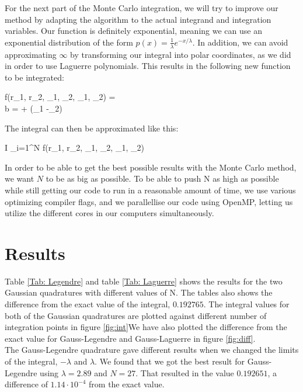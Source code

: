 \documentclass{article}
\begin{document}
		For the next part of the Monte Carlo integration, we will try to improve our method by adapting the algorithm to the actual integrand and integration variables. Our function is definitely exponential, meaning we can use an exponential distribution of the form $p(x)=\frac{1}{\lambda} e^{-x/\lambda}$. In addition, we can avoid approximating $\infty$ by transforming our integral into polar coordinates, as we did in order to use Laguerre polynomials. This results in the following new function to be integrated:

		\begin{flalign*}
			f(r_1, r_2, \phi_1, \phi_2, \theta_1, \theta_2) =  \\
			b =   +   \cos (\phi_1 -\phi_2)
		\end{flalign*}

		The integral can then be approximated like this:

		\begin{flalign*}
			I \approx {} \sum_{i=1}^{N} f(r_1, r_2, \phi_1, \phi_2, \theta_1, \theta_2)
		\end{flalign*}

		In order to be able to get the best possible results with the Monte Carlo method, we want $N$ to be as big as possible. To be able to push N as high as possible while still getting our code to run in a reasonable amount of time, we use various optimizing compiler flags, and we parallellise our code using OpenMP, letting us utilize the different cores in our computers simultaneously.

\section*{Results}
	Table \ref{Tab: Legendre} and table \ref{Tab: Laguerre} shows the results for the two Gaussian quadratures with different values of N. The tables also shows the difference from the exact value of the integral, $0.192765$. The integral values for both of the Gaussian quadratures are plotted against different number of integration points in figure \ref{fig:int}We have also plotted the difference from the exact value for Gauss-Legendre and Gauss-Laguerre in figure \ref{fig:diff}.\\

	The Gauss-Legendre quadrature gave different results when we changed the limits of the integral, $-\lambda$ and $\lambda$. We found that we got the best result for Gauss-Legendre using $\lambda = 2.89$ and $N=27$. That resulted in the value $0.192651$, a difference of $1.14 \cdot 10^{-4}$ from the exact value.
\end{document}
